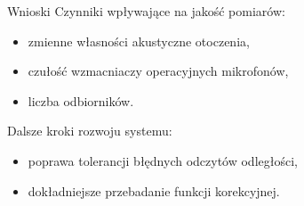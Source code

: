 \begin{frame}
    \begin{block}{Wnioski}
        Czynniki wpływające na jakość pomiarów:
        \begin{itemize}
            \item zmienne własności akustyczne otoczenia,
            \item czułość wzmacniaczy operacyjnych mikrofonów,
            \item liczba odbiorników.
        \end{itemize}
        Dalsze kroki rozwoju systemu:
        \begin{itemize}
            \item poprawa tolerancji błędnych odczytów odległości,
            \item dokładniejsze przebadanie funkcji korekcyjnej.
        \end{itemize}
    \end{block}
\end{frame}